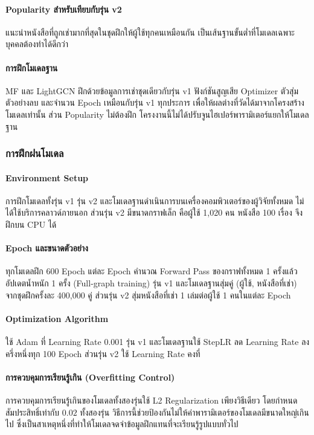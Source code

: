 \paragraph{Popularity สำหรับเทียบกับรุ่น v2}
แนะนำหนังสือที่ถูกเช่ามากที่สุดในชุดฝึกให้ผู้ใช้ทุกคนเหมือนกัน เป็นเส้นฐานขั้นต่ำที่โมเดลเฉพาะบุคคลต้องทำได้ดีกว่า

\paragraph{การฝึกโมเดลฐาน}
MF และ LightGCN ฝึกด้วยข้อมูลการเช่าชุดเดียวกับรุ่น v1 ฟังก์ชันสูญเสีย Optimizer ตัวสุ่มตัวอย่างลบ และจำนวน Epoch เหมือนกับรุ่น v1 ทุกประการ เพื่อให้ผลต่างที่วัดได้มาจากโครงสร้างโมเดลเท่านั้น ส่วน Popularity ไม่ต้องฝึก โครงงานนี้ไม่ได้ปรับจูนไฮเปอร์พารามิเตอร์แยกให้โมเดลฐาน

\subsubsection{การฝึกฝนโมเดล}

\paragraph{Environment Setup}
การฝึกโมเดลทั้งรุ่น v1 รุ่น v2 และโมเดลฐานดำเนินการบนเครื่องคอมพิวเตอร์ของผู้วิจัยทั้งหมด ไม่ได้ใช้บริการคลาวด์ภายนอก ส่วนรุ่น v2 มีขนาดกราฟเล็ก คือผู้ใช้ 1,020 คน หนังสือ 100 เรื่อง จึงฝึกบน CPU ได้ 

\paragraph{Epoch และขนาดตัวอย่าง}
ทุกโมเดลฝึก 600 Epoch แต่ละ Epoch คำนวณ Forward Pass ของกราฟทั้งหมด 1 ครั้งแล้วอัปเดตน้ำหนัก 1 ครั้ง (Full-graph training) รุ่น v1 และโมเดลฐานสุ่มคู่ (ผู้ใช้, หนังสือที่เช่า) จากชุดฝึกครั้งละ 400,000 คู่ ส่วนรุ่น v2 สุ่มหนังสือที่เช่า 1 เล่มต่อผู้ใช้ 1 คนในแต่ละ Epoch

\paragraph{Optimization Algorithm}
ใช้ Adam ที่ Learning Rate 0.001 รุ่น v1 และโมเดลฐานใช้ StepLR ลด Learning Rate ลงครึ่งหนึ่งทุก 100 Epoch ส่วนรุ่น v2 ใช้ Learning Rate คงที่

\paragraph{การควบคุมการเรียนรู้เกิน (Overfitting Control)}
การควบคุมการเรียนรู้เกินของโมเดลทั้งสองรุ่นใช้ L2 Regularization เพียงวิธีเดียว โดยกำหนดสัมประสิทธิ์เท่ากับ $0.02$ ทั้งสองรุ่น วิธีการนี้ช่วยป้องกันไม่ให้ค่าพารามิเตอร์ของโมเดลมีขนาดใหญ่เกินไป ซึ่งเป็นสาเหตุหนึ่งที่ทำให้โมเดลจดจำข้อมูลฝึกแทนที่จะเรียนรู้รูปแบบทั่วไป

